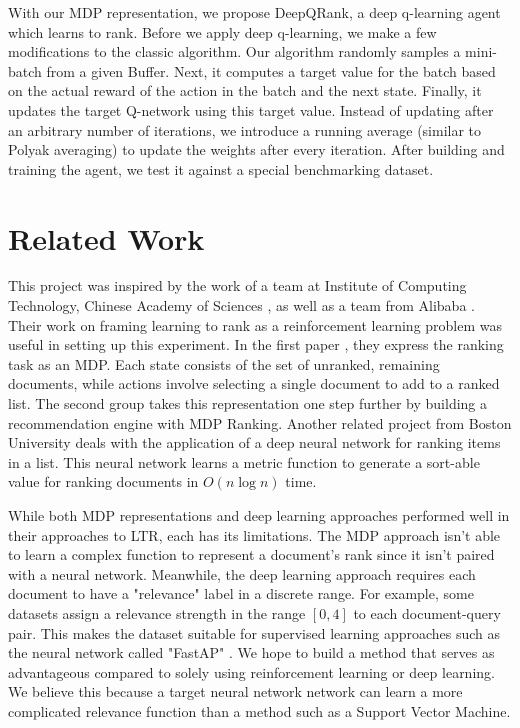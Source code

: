 \documentclass{article}
\begin{document}
With our MDP representation, we propose DeepQRank, a deep q-learning agent which learns to rank. Before we apply deep q-learning, we make a few modifications to the classic algorithm. Our algorithm randomly samples a mini-batch from a given Buffer. Next, it computes a target value for the batch based on the actual reward of the action in the batch and the next state. Finally, it updates the target Q-network using this target value. Instead of updating after an arbitrary number of iterations, we introduce a running average (similar to Polyak averaging) to update the weights after every iteration. After building and training the agent, we test it against a special benchmarking dataset. 

\section{Related Work}
This project was inspired by the work of a team at Institute of Computing Technology, Chinese Academy of Sciences \cite{source1}, as well as a team from Alibaba \cite{source3}. Their work on framing learning to rank as a reinforcement learning problem was useful in setting up this experiment. In the first paper \cite{source1}, they express the ranking task as an MDP. Each state consists of the set of unranked, remaining documents, while actions involve selecting a single document to add to a ranked list. The second group takes this representation one step further by building a recommendation engine with MDP Ranking. Another related project from Boston University \cite{source4} deals with the application of a deep neural network for ranking items in a list. This neural network learns a metric function to generate a sort-able value for ranking documents in $O(n\log n)$ time.

While both MDP representations and deep learning approaches performed well in their approaches to LTR, each has its limitations. The MDP approach isn't able to learn a complex function to represent a document's rank since it isn't paired with a neural network. Meanwhile, the deep learning approach requires each document to have a "relevance" label in a discrete range. For example, some datasets assign a relevance strength in the range $[0,4]$ to each document-query pair. This makes the dataset suitable for supervised learning approaches such as the neural network called "FastAP" \cite{source4}. We hope to build a method that serves as advantageous compared to solely using reinforcement learning or deep learning. We believe this because a target neural network network can learn a more complicated relevance function than a method such as a Support Vector Machine.
\end{document}
